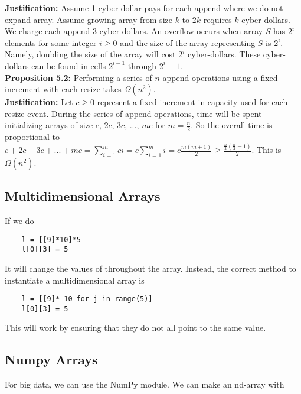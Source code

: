 \documentclass[]{article}
\begin{document}
\textbf{Justification:} Assume 1 cyber-dollar pays for each append where we do not expand array. Assume growing array from size $k$ to $2k$ requires $k$ cyber-dollars. We charge each append 3 cyber-dollars. An overflow occurs when array $S$ has $2^i$ elements for some integer $i \geq 0$ and the size of the array representing $S$ is $2^i$. Namely, doubling the size of the array will cost $2^i$ cyber-dollars. These cyber-dollars can be found in cells $2^{i - 1}$ through $2^i - 1$.\\


\textbf{Proposition 5.2:} Performing a series of $n$ append operations using a fixed increment with each resize takes $\Omega(n^2)$. \\

\textbf{Justification:} Let $c \geq 0$ represent a fixed increment in capacity used for each resize event. During the series of append operations, time will be spent initializing arrays of size $c$, $2c$, $3c$, ..., $mc$ for $m = \frac{n}{2}$. So the overall time is proportional to $c + 2c + 3c + ... + mc = \sum_{i=1}^m ci = c\sum_{i=1}^m i = c\frac{m(m+1)}{2} \geq \frac{\frac{n}{2}\left(\frac{n}{2}-1\right)}{2}$. This is $\Omega(n^2)$.\\


\subsection{Multidimensional Arrays}\bigbreak

If we do

\begin{lstlisting}
	l = [[9]*10]*5
	l[0][3] = 5
\end{lstlisting}

It will change the values of throughout the array. Instead, the correct method to instantiate a multidimensional array is

\begin{lstlisting}
	l = [[9]* 10 for j in range(5)]
	l[0][3] = 5
\end{lstlisting}

This will work by ensuring that they do not all point to the same value.\\


\subsection{Numpy Arrays}\bigbreak

For big data, we can use the NumPy module. We can make an nd-array with 
\end{document}
